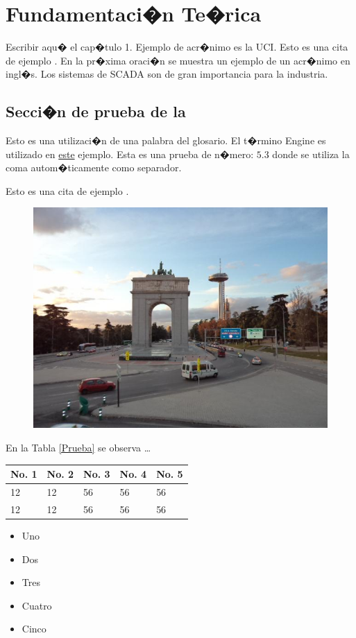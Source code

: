 \chapter{Fundamentaci�n Te�rica}

\label{chap:chapter1}

Escribir aqu� el cap�tulo 1. Ejemplo de acr�nimo es la \ac{UCI}. Esto es una cita de ejemplo \citep{Ou2013}. En la pr�xima oraci�n se muestra un ejemplo de un acr�nimo en ingl�s. Los sistemas de \ac{SCADA} son de gran importancia para la industria. 

\section{Secci�n de prueba de la } %

Esto es una utilizaci�n de una palabra del glosario. El t�rmino \gls{Engine} es utilizado en \ul{este} ejemplo. Esta es una prueba de n�mero: $5.3$ donde se utiliza la coma autom�ticamente como separador.

Esto es una cita de ejemplo \citep{Alfadhlani2011,Mathew2010}.

\begin{figure}[!htb]
\centering
{}
{\includegraphics[width=0.7\linewidth]{Images/DSC00461}}
\end{figure}

En la Tabla \ref{Prueba} se observa \dots\\

\begin{table}[!h]
\centering
{}
{
	\begin{tabular}{lllll}
	\hline \textbf{No. 1} & \textbf{No. 2} & \textbf{No. 3} & \textbf{No. 4} & \textbf{No. 5}\\ \hline
	12 & 12 & 56 & 56 &  56 \\ 
	12 & 12 & 56 & 56 &  56 \\
	\hline 
	\end{tabular}
}
\end{table}

\lipsum[1-50]
\begin{itemize}
\item Uno
\item Dos
\item Tres
\item Cuatro
\item Cinco
\end{itemize}

\lipsum[1-50]
\lipsum[1-50]
\lipsum[1-50]
\lipsum[1-50]
\lipsum[1-50]
\lipsum[1-50]